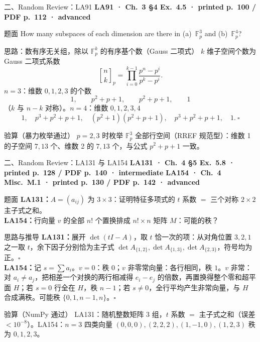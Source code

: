 \documentclass[aspectratio=169,10pt,fontset=none]{ctexbeamer}
\newcommand{\ex}[1]{\textcolor{accent}{\footnotesize\bfseries #1}}
\begin{document}
\begin{frame}[t]{二、Random Review：LA91}
  \leavevmode\ex{LA91 · Ch.~3 §4 Ex.~4.5 · printed p.~100 / PDF p.~112 · advanced}
  \begin{block}{\footnotesize 题面}
    \scriptsize How many subspaces of each dimension are there in (a)~$\mathbb F_p^3$ and (b)~$\mathbb F_p^4$?
  \end{block}
  \begin{exampleblock}{\footnotesize 思路：数有序无关组，除以 $\mathbb F_p^k$ 的有序基个数（Gauss 二项式）}
    \scriptsize
    $k$ 维子空间个数为 Gauss 二项式系数
    $${n\brack k}_p=\prod_{i=0}^{k-1}\frac{p^n-p^i}{p^k-p^i}.$$
    $n=3$：维数 $0,1,2,3$ 的个数
    $$1,\qquad p^2+p+1,\qquad p^2+p+1,\qquad1$$
    （$k$ 与 $n-k$ 对称）。$n=4$：维数 $0,1,2,3,4$
    $$1,\quad p^3+p^2+p+1,\quad(p^2+1)(p^2+p+1),\quad p^3+p^2+p+1,\quad1.\ \square$$
  \end{exampleblock}
  \begin{block}{\footnotesize 验算（暴力枚举通过）}
    \scriptsize $p=2,3$ 时枚举 $\mathbb F_p^3$ 全部行空间（RREF 规范型）：维数 1 的子空间 $7,13$ 个、维数 2 的 $7,13$ 个，与公式 $p^2+p+1$ 一致。
  \end{block}
\end{frame}

\begin{frame}[t]{二、Random Review：LA131 与 LA154}
  \leavevmode\ex{LA131 · Ch.~4 §5 Ex.~5.8 · printed p.~128 / PDF p.~140 · intermediate}\quad
  \ex{LA154 · Ch.~4 Misc.\ M.1 · printed p.~130 / PDF p.~142 · advanced}
  \begin{block}{\footnotesize 题面}
    \scriptsize \textbf{LA131：}$A=(a_{ij})$ 为 $3\times3$：证明特征多项式的 $t$ 系数 $=$ 三个对称 $2\times2$ 主子式之和。\\
    \textbf{LA154：}行向量 $v$ 的全部 $n!$ 个置换排成 $n!\times n$ 矩阵 $M$：可能的秩？
  \end{block}
  \begin{exampleblock}{\footnotesize 思路与推导}
    \scriptsize
    \textbf{LA131：}展开 $\det(tI-A)$，取 $t$ 恰一次的项：从对角位置 $3,2,1$ 之一取 $t$，余下因子分别恰为主子式 $\det A_{\{1,2\}},\det A_{\{1,3\}},\det A_{\{2,3\}}$，符号均为正。$\square$\\[2pt]
    \textbf{LA154：}记 $s=\sum a_i$。$v=0$：秩 $0$；$v$ 非零常向量：各行相同，秩 $1$。$v$ 非常：对 $a_i\ne a_j$，把相差一个对换的两行相减得 $e_i-e_j$ 的倍数，再置换得整个零和超平面 $H$；若 $s=0$ 行全在 $H$，秩 $n-1$；若 $s\ne0$，全行平均产生非常向量，与 $H$ 合成满秩。可能秩 $\{0,1,n-1,n\}$。$\square$
  \end{exampleblock}
  \begin{block}{\footnotesize 验算（NumPy 通过）}
    \scriptsize LA131：随机整数矩阵 3 组，$t$ 系数 $=$ 主子式之和（误差 $<10^{-8}$）。LA154：$n=3$ 四类向量 $(0,0,0),(2,2,2),(1,-1,0),(1,2,3)$ 秩为 $0,1,2,3$。
  \end{block}
\end{frame}
\end{document}
